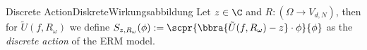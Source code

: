 \begin{mdef}{Discrete Action}{DiskreteWirkungsabbildung}
    Let $z\in\C$ and $R:(\Omega\to V_{d,N})$, then for $\tilde U(f,R_\omega)$ we define $S_{z,R_\omega}(\phi):=\scpr{\bbra{\tilde U(f,R_\omega) - z}\cdot\phi}{\phi}$ as the \textit{discrete action} of the ERM model. 
\end{mdef}
